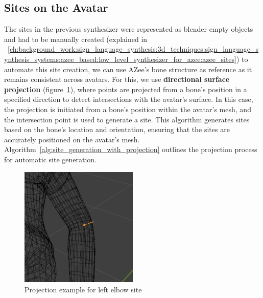 \documentclass[../../main.tex]{subfiles}
\begin{document}
\subsection{Sites on the Avatar}
\label{ch:avatar_creation_pose_synthesis:proc_rig_signing_avatars:auto_site_generation}

The sites in the previous synthesizer were represented as blender empty objects and had to be manually created (explained in ~\ref{ch:background_work:sign_language_synthesis:3d_techniques:sign_language_synthesis_systems:azee_based:low_level_synthesizer_for_azee:azee_sites}) to automate this site creation, we can use AZee's bone structure as reference as it remains consistent across avatars. For this, we use \textbf{directional surface projection} (figure~\ref{fig:site_surface_projection}), where points are projected from a bone's position in a specified direction to detect intersections with the avatar's surface. In this case, the projection is initiated from a bone's position within the avatar's mesh, and the intersection point is used to generate a site. This algorithm generates sites based on the bone's location and orientation, ensuring that the sites are accurately positioned on the avatar's mesh. Algorithm~\ref{alg:site_generation_with_projection} outlines the projection process for automatic site generation.

\begin{figure}[ht]
    \centering
    \includegraphics[width=0.5\textwidth]{chapters/avatar_creation_pose_synthesis/images/site_surface_projection.png}
    \caption{Projection example for left elbow site}
    \label{fig:site_surface_projection}
\end{figure}
\end{document}
